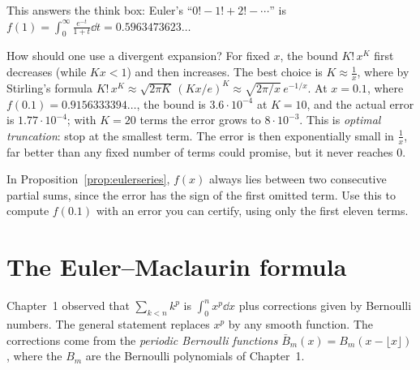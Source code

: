 This answers the think box: Euler's ``$0!-1!+2!-\cdots$'' is $f(1)=\int_0^\infty\frac{e^{-t}}{1+t}\dd t=0.5963473623\ldots$

How should one use a divergent expansion? For fixed $x$, the bound $K!\,x^K$ first decreases (while $Kx<1$) and then increases. The best
choice is $K\approx\frac1x$, where by Stirling's formula $K!\,x^K\approx\sqrt{2\pi K}\,(Kx/e)^K\approx\sqrt{2\pi/x}\,e^{-1/x}$. At $x=0.1$, where
$f(0.1)=0.9156333394\ldots$, the bound is $3.6\cdot10^{-4}$ at $K=10$, and the actual error is $1.77\cdot10^{-4}$; with $K=20$ terms the error grows to $8\cdot10^{-3}$.
This is \emph{optimal truncation}: stop at the smallest term. The error is then exponentially small in $\frac1x$, far better than any fixed
number of terms could promise, but it never reaches $0$.

\begin{think}
In Proposition~\ref{prop:eulerseries}, $f(x)$ always lies between two consecutive partial sums, since the error has the sign of the first
omitted term. Use this to compute $f(0.1)$ with an error you can certify, using only the first eleven terms.
\end{think}

\section{The Euler--Maclaurin formula}

Chapter~1 observed that $\sum_{k<n}k^p$ is $\int_0^nx^p\dd x$ plus corrections given by Bernoulli numbers. The general statement replaces $x^p$ by
any smooth function. The corrections come from the \emph{periodic Bernoulli functions} $\bar B_m(x)=B_m(x-\lfloor x\rfloor)$, where the $B_m$ are the
Bernoulli polynomials of Chapter~1.

